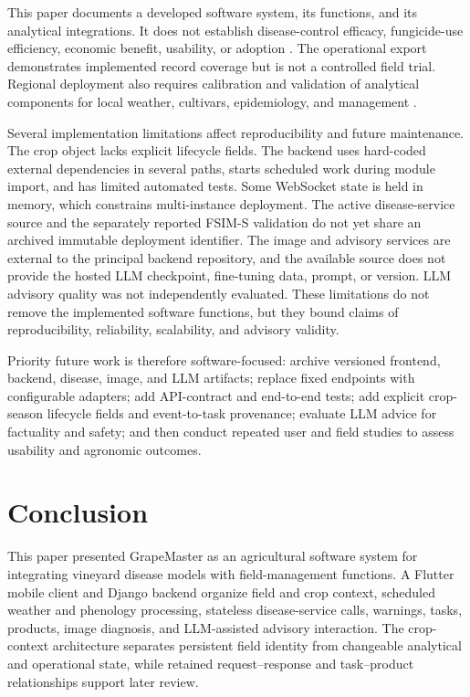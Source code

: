 \documentclass[12pt]{article}
\begin{document}
This paper documents a developed software system, its functions, and its analytical integrations. It does not establish disease-control efficacy, fungicide-use efficiency, economic benefit, usability, or adoption \citep{rossiAddressingImplementationProblem2014,roseDecisionSupportTools2016}. The operational export demonstrates implemented record coverage but is not a controlled field trial. Regional deployment also requires calibration and validation of analytical components for local weather, cultivars, epidemiology, and management \citep{bregaglioPublicDecisionSupport2022}.

Several implementation limitations affect reproducibility and future maintenance. The crop object lacks explicit lifecycle fields. The backend uses hard-coded external dependencies in several paths, starts scheduled work during module import, and has limited automated tests. Some WebSocket state is held in memory, which constrains multi-instance deployment. The active disease-service source and the separately reported FSIM-S validation do not yet share an archived immutable deployment identifier. The image and advisory services are external to the principal backend repository, and the available source does not provide the hosted LLM checkpoint, fine-tuning data, prompt, or version. LLM advisory quality was not independently evaluated. These limitations do not remove the implemented software functions, but they bound claims of reproducibility, reliability, scalability, and advisory validity.

Priority future work is therefore software-focused: archive versioned frontend, backend, disease, image, and LLM artifacts; replace fixed endpoints with configurable adapters; add API-contract and end-to-end tests; add explicit crop-season lifecycle fields and event-to-task provenance; evaluate LLM advice for factuality and safety; and then conduct repeated user and field studies to assess usability and agronomic outcomes.

\section{Conclusion}\label{conclusion}

This paper presented GrapeMaster as an agricultural software system for integrating vineyard disease models with field-management functions. A Flutter mobile client and Django backend organize field and crop context, scheduled weather and phenology processing, stateless disease-service calls, warnings, tasks, products, image diagnosis, and LLM-assisted advisory interaction. The crop-context architecture separates persistent field identity from changeable analytical and operational state, while retained request--response and task--product relationships support later review.
\end{document}
